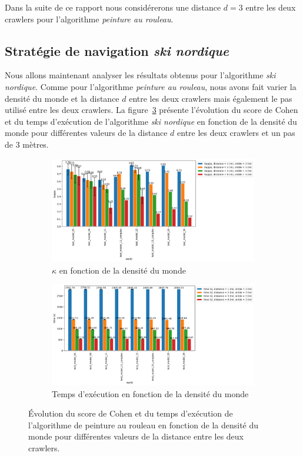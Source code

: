 \documentclass[francais,RandD]{rapportPFE}
\begin{document}
			Dans la suite de ce rapport nous considérerons une distance $d = 3$ entre les deux crawlers pour l'algorithme \textit{peinture au rouleau}.
		\subsection*{Stratégie de navigation \textit{ski nordique}}
			Nous allons maintenant analyser les résultats obtenus pour l'algorithme \textit{ski nordique}.
			Comme pour l'algorithme \textit{peinture au rouleau}, nous avons fait varier la densité du monde et la distance $d$ entre les deux crawlers mais également le pas utilisé entre les deux crawlers.
			La figure~\ref{fig:ski_nordique-world_d} présente l'évolution du score de Cohen et du temps d'exécution de l'algorithme \textit{ski nordique} en fonction de la densité du monde pour différentes valeurs de la distance $d$ entre les deux crawlers et un pas de 3 mètres.

			\begin{figure}[h!]
				\centering
				\begin{subfigure}[t]{0.9\linewidth}
					\includegraphics[width=\linewidth]{graphics/ski_nordique-kappa_vs_world_for_each_d.png}
					\caption{$\kappa$ en fonction de la densité du monde}
					\label{fig:ski_nordique-kappa_vs_world_d}
				\end{subfigure}
				\hfill
				\begin{subfigure}[t]{0.9\linewidth}
						\includegraphics[width=\linewidth]{graphics/ski_nordique-time_vs_world_for_each_d.png}
						\caption{Temps d'exécution en fonction de la densité du monde}
						\label{fig:ski_nordique-time_vs_world_d}
				\end{subfigure}
				\caption{Évolution du score de Cohen et du temps d'exécution de l'algorithme de peinture au rouleau en fonction de la densité du monde pour différentes valeurs de la distance entre les deux crawlers.}
				\label{fig:ski_nordique-world_d}
			\end{figure}
\end{document}
